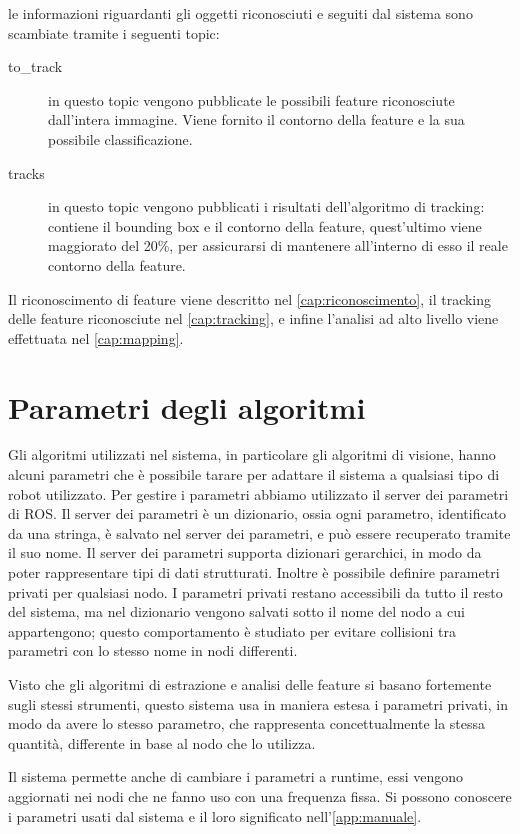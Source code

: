 le informazioni riguardanti gli oggetti riconosciuti e seguiti dal sistema sono scambiate tramite i seguenti topic:

\begin{description}
 \item [\/to\_track] in questo topic vengono pubblicate le possibili feature riconosciute dall'intera immagine. Viene fornito il contorno della feature e la sua possibile classificazione.
 \item [\/tracks] in questo topic vengono pubblicati i risultati dell'algoritmo di tracking: contiene il bounding box e il contorno della feature, quest'ultimo viene maggiorato del 20\%, per assicurarsi di mantenere all'interno di esso il reale contorno della feature.
\end{description}

Il riconoscimento di feature viene descritto nel \autoref{cap:riconoscimento}, il tracking delle feature riconosciute nel \autoref{cap:tracking}, e infine l'analisi ad alto livello viene effettuata nel \autoref{cap:mapping}.

\section{Parametri degli algoritmi}

Gli algoritmi utilizzati nel sistema, in particolare gli algoritmi di visione, hanno alcuni parametri che è possibile tarare per adattare il sistema a qualsiasi tipo di robot utilizzato.
Per gestire i parametri abbiamo utilizzato il server dei parametri di ROS.
Il server dei parametri è un dizionario, ossia ogni parametro, identificato da una stringa, è salvato nel server dei parametri, e può essere recuperato tramite il suo nome. 
Il server dei parametri supporta dizionari gerarchici, in modo da poter rappresentare tipi di dati strutturati. 
Inoltre è possibile definire parametri privati per qualsiasi nodo. I parametri privati restano accessibili da tutto il resto del sistema, ma nel dizionario vengono salvati sotto il nome del nodo a cui appartengono; questo comportamento è studiato per evitare collisioni tra parametri con lo stesso nome in nodi differenti.

Visto che gli algoritmi di estrazione e analisi delle feature si basano fortemente sugli stessi strumenti, questo sistema usa in maniera estesa i parametri privati, in modo da avere lo stesso parametro, che rappresenta concettualmente la stessa quantità, differente in base al nodo che lo utilizza.

Il sistema permette anche di cambiare i parametri a runtime, essi vengono aggiornati nei nodi che ne fanno uso con una frequenza fissa.
Si possono conoscere i parametri usati dal sistema e il loro significato nell'\autoref{app:manuale}.




